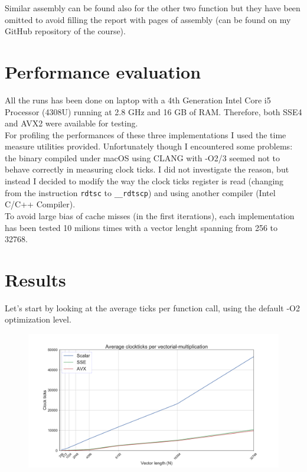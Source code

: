 \documentclass[paper=a4, fontsize=12pt]{scrartcl} %
\numberwithin{equation}{section}
\numberwithin{figure}{section}
\numberwithin{table}{section}
\begin{document}
Similar assembly can be found also for the other two function but they have been omitted to avoid
filling the report with pages of assembly (can be found on my GitHub repository of the course).

\section{Performance evaluation}
All the runs has been done on laptop with a 4th Generation Intel Core i5 Processor (4308U)
running at 2.8 GHz and 16 GB of RAM. Therefore, both SSE4 and AVX2 were available for testing.\\

For profiling the performances of these three implementations I used the time measure
utilities provided. Unfortunately though I encountered some problems: the binary compiled under macOS using CLANG
with -O2/3 seemed not to behave correctly in measuring clock ticks. I did not investigate
the reason, but instead I decided to modify the way
the clock ticks register is read (changing from the instruction \texttt{rdtsc} to \texttt{\_\_rdtscp}) and
using another compiler (Intel C/C++ Compiler).\\

To avoid large bias of cache misses (in the first iterations), each implementation has been tested
10 milions times with a vector lenght spanning from 256 to 32768.

\section{Results}
Let's start by looking at the average ticks per function call, using the default -O2
optimization level.

\begin{figure}[!ht]
    \includegraphics[width=\textwidth]{avg_O2.pdf}
\end{figure}
\end{document}
